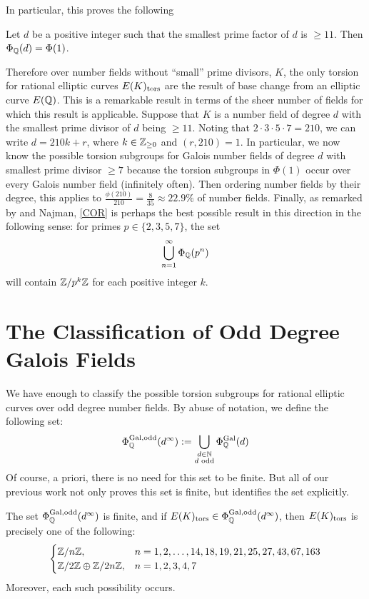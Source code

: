 In particular, this proves the following


\begin{cor}
Let $d$ be a positive integer such that the smallest prime factor of $d$ is $\geq 11$. Then $\Phi_{\mathbb{Q}}(d)= \Phi(1)$. 
\end{cor}


Therefore over number fields without ``small'' prime divisors, $K$, the only torsion for rational elliptic curves $E(K)_{\text{tors}}$ are the result of base change from an elliptic curve $E(\mathbb{Q})$. This is a remarkable result in terms of the sheer number of fields for which this result is applicable. Suppose that $K$ is a number field of degree $d$ with the smallest prime divisor of $d$ being $\geq 11$. Noting that $2 \cdot 3 \cdot 5 \cdot 7= 210$, we can write $d= 210k + r$, where $k \in \mathbb{Z}_{\geq 0}$ and $(r,210)= 1$. In particular, we now know the possible torsion subgroups for Galois number fields of degree $d$ with smallest prime divisor $\geq 7$ because the torsion subgroups in $\Phi(1)$ occur over every Galois number field (infinitely often). Then ordering number fields by their degree, this applies to $\frac{\phi(210)}{210}= \frac{8}{35} \approx 22.9\%$ of number fields. Finally, as remarked by \gonjim{} and Najman, \ref{COR} is perhaps the best possible result in this direction in the following sense: for primes $p \in \{ 2, 3, 5, 7 \}$, the set
	\[
	\bigcup_{n=1}^\infty \Phi_{\mathbb{Q}}(p^n)
	\]
will contain $\mathbb{Z}/p^k\mathbb{Z}$ for each positive integer $k$. 





\section{The Classification of Odd Degree Galois Fields}

We have enough to classify the possible torsion subgroups for rational elliptic curves over odd degree number fields. By abuse of notation, we define the following set:
	\[
	\Phi_{\mathbb{Q}}^{\operatorname{Gal},\text{odd}}(d^\infty):= \bigcup_{\substack{d \in \mathbb{N} \\ d \text{ odd}}} \Phi_{\mathbb{Q}}^{\operatorname{Gal}}(d)
	\]
Of course, a priori, there is no need for this set to be finite. But all of our previous work not only proves this set is finite, but identifies the set explicitly. 

\begin{thm} \label{thm:listoddgroups}
The set $\Phi_{\mathbb{Q}}^{\operatorname{Gal},\text{odd}}(d^\infty)$ is finite, and if $E(K)_{\text{tors}} \in \Phi_{\mathbb{Q}}^{\operatorname{Gal},\text{odd}}(d^\infty)$, then $E(K)_{\text{tors}}$ is precisely one of the following:
	\[
	\begin{cases}
	\mathbb{Z}/n\mathbb{Z}, & n= 1, 2, \ldots, 14, 18, 19, 21, 25, 27, 43, 67, 163 \\
	\mathbb{Z}/2\mathbb{Z} \oplus \mathbb{Z}/2n\mathbb{Z}, & n= 1, 2, 3, 4, 7
	\end{cases}
	\]
Moreover, each such possibility occurs. 
\end{thm}


